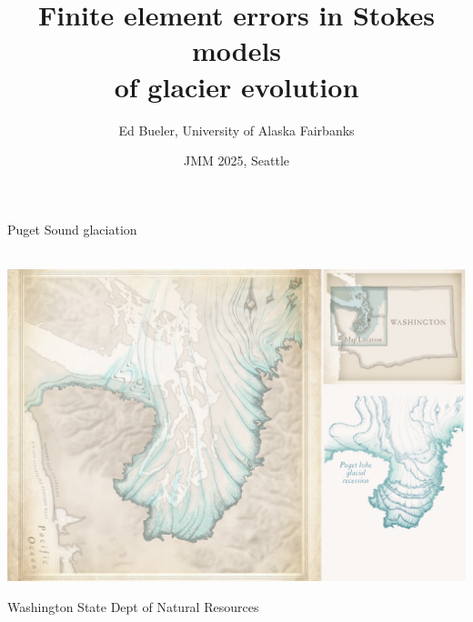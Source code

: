 \documentclass[10pt,dvipsnames]{beamer}
\title{Finite element errors in Stokes models \\ of glacier evolution}
\date{JMM 2025, Seattle}
\author{Ed Bueler, University of Alaska Fairbanks}
\theoremstyle{theorem}
\begin{document}
\graphicspath{{figs/}{../NWG24/figs/}{../../paper/figs/}}

\maketitle


\begin{frame}{Puget Sound glaciation}

\mbox{\hspace{-7mm} \,\includegraphics[width=1.1\textwidth]{puget}}

\vspace{-4mm}

\hfill {\tiny Washington State Dept of Natural Resources}
\end{frame}
\end{document}
